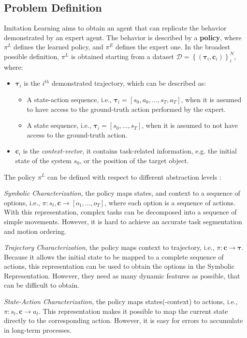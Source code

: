 \subsection{Problem Definition}
\label{sec:problem_formulation}
Imitation Learning aims to obtain an agent that can replicate the behavior demonstrated by an expert agent. The behavior is described by a \textbf{policy}, where $\pi^{L}$ defines the learned policy, and $\pi^{E}$ defines the expert one. In the broadest possible definition, $\pi^{L}$ is obtained starting from a dataset $\mathcal{D}=\left \{ \left ( \boldsymbol{\tau}_{i}, \boldsymbol{c}_{i}\right ) \right \}_{i}^{N}$, where:
\begin{itemize}
    \item $\boldsymbol{\tau}_{i}$ is the $i^{th}$ demonstrated trajectory, which can be described as:
        \begin{itemize}
            \item A state-action sequence, i.e., $\boldsymbol{\tau}_{i} = [s_{0}, a_{0}, \dots, s_{T}, a_{T}]$, when it is assumed to have access to the ground-truth action performed by the expert.
            \item A state sequence, i.e., $\boldsymbol{\tau}_{i} = [s_{0}, \dots, s_{T}]$, when it is assumed to not have access to the ground-truth action.
        \end{itemize}    
    \item $\boldsymbol{c}_{i}$ is the \textit{context-vector}, it contains task-related information, e.g. the initial state of the system $s_{0}$, or the position of the target object.
\end{itemize}
The policy $\pi^{L}$ can be defined with respect to different abstraction levels \cite{fang2019survey,osa2018algorithmic}:   
\begin{enumerate*}[label=(\textbf{\alph*})]
    \item \textit{Symbolic Characterization}, the policy maps states, and context to a sequence of options, i.e., $\pi: s_{t}, \textbf{c} \rightarrow [o_1, \dots, o_T]$, where each option is a sequence of actions. With this representation, complex tasks can be decomposed into a sequence of simple movements. However, it is hard to achieve an accurate task segmentation and motion ordering.
    \item \textit{Trajectory Characterization}, the policy maps context to trajectory, i.e., $\pi: \mathbf{c} \rightarrow \boldsymbol{\tau}$. Because it allows the initial state to be mapped to a complete sequence of actions, this representation can be used to obtain the options in the Symbolic Representation. However, they need as many dynamic features as possible, that can be difficult to obtain.
    \item \textit{State-Action Characterization}, the policy maps states(-context) to actions, i.e., $\pi: s_{t}, \textbf{c} \rightarrow a_{t}$. This representation makes it possible to map the current state directly to the corresponding action. However, it is easy for errors to accumulate in long-term processes.
\end{enumerate*} 
